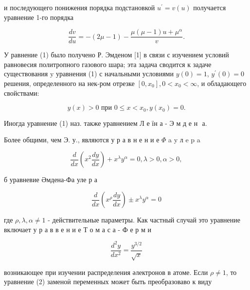 \documentclass[10pt]{article}
\begin{document}
и последующего понижения порядка подстановкой $u^{\prime}=v(u)$ получается уравнение 1-го порядка



\[

\frac{d v}{d u}=-(2 \mu-1)-\frac{\mu(\mu-1) u+\mu^{\alpha}}{v} .

\]



У равнение (1) было получено Р. Эмденом [1] в связи с изучением условий равновесия политропного газового шара; эта задача сводится к задаче существования $\mathrm{y}$ уравнения (1) с начальными условиями $y(0)=1$, $y^{\prime}(0)=0$ решения, определенного на нек-ром отрезке $\left[0, x_{0}\right], 0<x_{0}<\infty$, и обладающего свойствами:



\[

y(x)>0 \text { при } 0 \leqslant x<x_{0}, y\left(x_{0}\right)=0 .

\]



Иногда уравнение (1) наз. также уравнением Л е їн а - Э м д е н $\mathbf{\text { а. }}$



Более общими, чем Э. у., являются у р а в н е н и е $\Phi$ a y л e p a



\[

\frac{d}{d x}\left(x^{2} \frac{d y}{d x}\right)+x^{\lambda} y^{\alpha}=0, \lambda>0, \alpha>0,

\]



б уравневие Әмдена-Фа уле р а



\[

\frac{d}{d x}\left(x^{\rho} \frac{d y}{d x}\right) \pm x^{\lambda} y^{\alpha}=0

\]



где $\rho, \lambda, \alpha \neq 1$ - действительные параметры. Как частный случай это уравнение включает у р а в в е н и е Т о м а с а - Ф е р м и



\[

\frac{d^{2} y}{d x^{2}}=\frac{y^{3 / 2}}{\sqrt{x}}

\]



возникающее при изучении распределения әлектронов в атоме. Если $\rho \neq 1$, то уравнение (2) заменоӥ переменных может быть преобразоваво к виду
\end{document}
